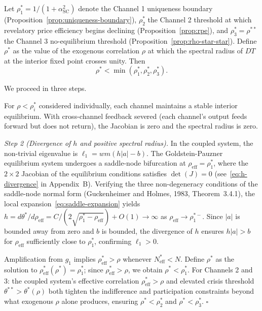 \begin{proposition}\label{prop:bifurcation}
  Let $\rho_1^* = 1/(1+\alpha_{\text{SC}}^2)$ denote the Channel 1 uniqueness boundary (Proposition~\ref{prop:uniqueness-boundary}), $\rho_2^*$ the Channel 2 threshold at which revelatory price efficiency begins declining (Proposition~\ref{prop:rpe}), and $\rho_3^* = \rho^{**}$ the Channel 3 no-equilibrium threshold (Proposition~\ref{prop:rho-star-star}). Define $\rho^*$ as the value of the exogenous correlation $\rho$ at which the spectral radius of $DT$ at the interior fixed point crosses unity. Then
  \begin{equation}\label{eq:bifurcation}
    \rho^* < \min(\rho_1^*, \rho_2^*, \rho_3^*).
  \end{equation}

   We proceed in three steps.

   For $\rho < \rho_i^*$ considered individually, each channel maintains a stable interior equilibrium. With cross-channel feedback severed (each channel's output feeds forward but does not return), the Jacobian is zero and the spectral radius is zero.

  \emph{Step 2 (Divergence of $h$ and positive spectral radius).} In the coupled system, the non-trivial eigenvalue is $\ell_1 = wm(h|a|-b)$. The Goldstein-Pauzner equilibrium system undergoes a saddle-node bifurcation at $\rho_{\text{eff}} = \rho_1^*$, where the $2 \times 2$ Jacobian of the equilibrium conditions satisfies $\det(J) = 0$ (see~\eqref{eq:h-divergence} in Appendix~B). Verifying the three non-degeneracy conditions of the saddle-node normal form (Guckenheimer and Holmes, 1983, Theorem~3.4.1), the local expansion~\eqref{eq:saddle-expansion} yields $h = d\theta^*/d\rho_{\text{eff}} = C/(2\sqrt{\rho_1^* - \rho_{\text{eff}}}) + O(1) \to \infty$ as $\rho_{\text{eff}} \to \rho_1^{*-}$. Since $|a|$ is bounded away from zero and $b$ is bounded, the divergence of $h$ ensures $h|a| > b$ for $\rho_{\text{eff}}$ sufficiently close to $\rho_1^*$, confirming $\ell_1 > 0$.

   Amplification from $g_1$ implies $\rho_{\text{eff}}^* > \rho$ whenever $N_{\text{eff}}^* < N$. Define $\rho^*$ as the solution to $\rho_{\text{eff}}^*(\rho^*) = \rho_1^*$; since $\rho_{\text{eff}}^* > \rho$, we obtain $\rho^* < \rho_1^*$. For Channels 2 and 3: the coupled system's effective correlation $\rho_{\text{eff}}^* > \rho$ and elevated crisis threshold $\theta^{**} > \theta^*(\rho)$ both tighten the indifference and participation constraints beyond what exogenous $\rho$ alone produces, ensuring $\rho^* < \rho_2^*$ and $\rho^* < \rho_3^*$. $\square$
\end{proposition}

